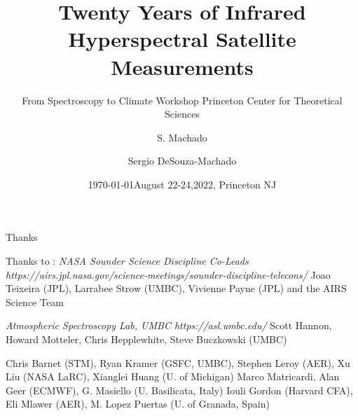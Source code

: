 \documentclass[10pt,t]{beamer}
\author{S. Machado}
\date{\today}
\title{\large Twenty Years of Infrared Hyperspectral Satellite Measurements}
\subtitle{\footnotesize{From Spectroscopy to Climate Workshop \newline Princeton Center for Theoretical Sciences}}
\date{\vspace{0.1in}\footnotesize{August 22-24,2022, Princeton NJ \vfill}}
\author{Sergio DeSouza-Machado\inst{1}}
\institute[UMBC]{\inst{1}UMBC JCET}
\begin{document}
\maketitle


\begin{frame}[shrink=2]{Thanks}
\begin{block}{Thanks to :}
\vspace{0.25in}
\emph{NASA Sounder Science Discipline Co-Leads} \newline
\emph{https://airs.jpl.nasa.gov/science-meetings/sounder-discipline-telecons/} \newline
  Joao Teixeira (JPL), Larrabee Strow (UMBC), Vivienne Payne (JPL) \newline
and the AIRS Science Team

\vspace{0.25in}
\emph{Atmospheric Spectroscopy Lab, UMBC https://asl.umbc.edu/ } \newline
Scott Hannon, Howard Motteler, Chris Hepplewhite, Steve Buczkowski (UMBC) \newline

\vspace{0.25in}
Chris Barnet (STM), Ryan Kramer (GSFC, UMBC), Stephen Leroy (AER), Xu Liu (NASA LaRC), Xianglei Huang (U. of Michigan) \newline
Marco Matricardi, Alan Geer (ECMWF), G. Masiello (U. Basilicata, Italy)  \newline
Iouli Gordon (Harvard CFA), Eli Mlawer (AER), M. Lopez Puertas (U. of Granada, Spain)
\end{block}
\end{frame}
\end{document}
